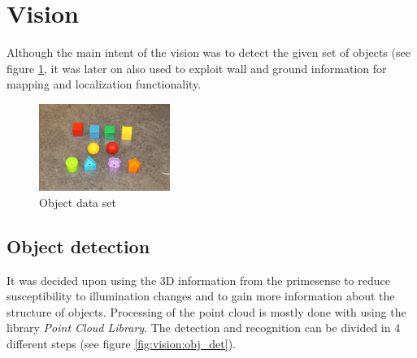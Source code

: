 \section{Vision}

Although the main intent of the vision was to detect the given set of objects (see figure \ref{fig:object_set},
it was later on also used to exploit wall and ground information for mapping and localization functionality.

\begin{figure}
\begin{center}
\includegraphics[width=0.38\textwidth]{figures/object_dataset}
\end{center}
\caption{Object data set}
\label{fig:object_set}
\end{figure}

\subsection{Object detection}

It was decided upon using the 3D information from the primesense to reduce susceptibility to illumination changes and to gain more information about the structure of objects.
Processing of the point cloud is mostly done with using the library \textit{Point Cloud Library}.
The detection and recognition can be divided in 4 different steps (see figure \ref{fig:vision:obj_det}).

